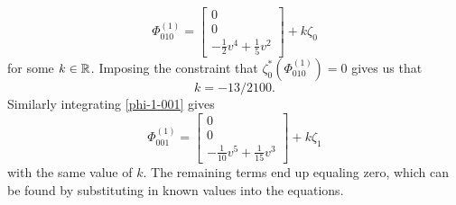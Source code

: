 \begin{equation*}
	\Phi_{010}^{(1)} = \begin{bmatrix}
		0 \\ 0 \\ - \frac 1 2 v^4 + \frac 1 5 v^2
	\end{bmatrix} + k  \zeta_0
\end{equation*}
for some \(k\in \mathbb{R}\). Imposing the constraint that \(\zeta_0^*(\Phi_{010}^{(1)}) = 0\) gives us that \[k = -13/2100.\] Similarly integrating \cref{phi-1-001} gives
\begin{equation*}
	\Phi_{001}^{(1)} = \begin{bmatrix}
		0 \\ 0 \\ - \frac 1 {10} v^5 + \frac 1 {15} v^3
	\end{bmatrix} + k  \zeta_1
\end{equation*}
with the same value of \(k\). The remaining terms end up equaling zero, which can be found by substituting in known values into the equations.

